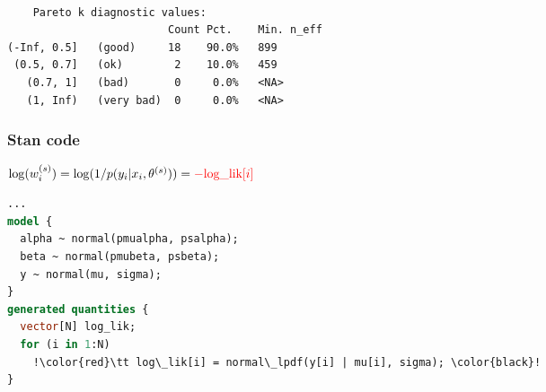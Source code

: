 \documentclass[10pt]{beamer}
\begin{document}
\begin{frame}[fragile]

  \\
  {\scriptsize
\begin{lstlisting}
    Pareto k diagnostic values:
                         Count Pct.    Min. n_eff
(-Inf, 0.5]   (good)     18    90.0%   899
 (0.5, 0.7]   (ok)        2    10.0%   459
   (0.7, 1]   (bad)       0     0.0%   <NA>
   (1, Inf)   (very bad)  0     0.0%   <NA>
\end{lstlisting}
}

\end{frame}

\begin{frame}[fragile]
\frametitle{Stan code}

  \vspace{\baselineskip}
  $ \log(w_i^{(s)}) = \log(1/p(y_i|x_i,\theta^{(s)})) = {\color{red}-\mbox{log\_lik}[i]}$
  \vspace{\baselineskip}

  \pause
  {\small
\begin{lstlisting}[language=Stan,escapechar=!]
...
model {
  alpha ~ normal(pmualpha, psalpha);
  beta ~ normal(pmubeta, psbeta);
  y ~ normal(mu, sigma);
}
generated quantities {
  vector[N] log_lik;
  for (i in 1:N)
    !\color{red}\tt log\_lik[i] = normal\_lpdf(y[i] | mu[i], sigma); \color{black}!
}
\end{lstlisting}
  }

\end{frame}
\end{document}
